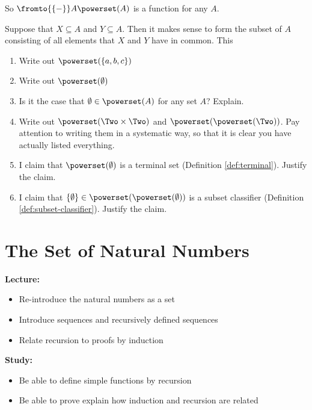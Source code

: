 So $\fromto {\{-\}}A{\powerset(A)}$ is a function for any $A$. 

Suppose that $X\subseteq A$ and $Y\subseteq A$. Then it makes sense to form the subset of $A$ consisting of all elements that $X$ and $Y$ have in common. This 

\begin{exercises}
	\begin{enumerate}
		\item Write out $\powerset(\{a,b,c\})$
		\item Write out $\powerset(\emptyset)$
		\item Is it the case that $\emptyset \in \powerset(A)$ for any set $A$? Explain. 
		\item Write out $\powerset(\Two\times \Two)$ and $\powerset(\powerset(\Two))$. Pay attention to writing them in a systematic way, so that it is clear you have actually listed everything.
		\item I claim that $\powerset(\emptyset)$ is a terminal set (Definition \ref{def:terminal}). Justify the claim.
		\item I claim that $\{\emptyset\}\in \powerset(\powerset(\emptyset))$ is a subset classifier (Definition \ref{def:subset-classifier}). Justify the claim.
	\end{enumerate}
\end{exercises}

\chapter{The Set of Natural Numbers}\label{lec:natural-numbers}

\begin{goals}
\noindent\textbf{Lecture:}
\begin{itemize}
	\item Re-introduce the natural numbers as a set
	\item Introduce sequences and recursively defined sequences
	\item Relate recursion to proofs by induction
\end{itemize}

\noindent\textbf{Study:}
\begin{itemize}
	\item Be able to define simple functions by recursion
	\item Be able to prove explain how induction and recursion are related
\end{itemize}
\end{goals}

